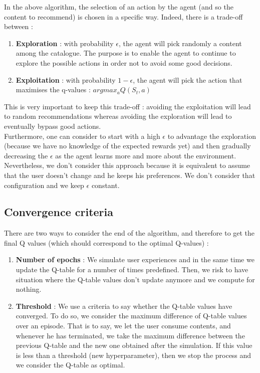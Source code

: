 \documentclass[a4paper]{article}
\begin{document}
In the above algorithm, the selection of an action by the agent (and so the content to recommend) is chosen in a specific way. Indeed, there is a trade-off between : 
	\begin{enumerate}
		\item \textbf{Exploration} : with probability $\epsilon$, the agent will pick randomly a content among the catalogue. The purpose is to enable the agent to continue to explore the possible actions in order not to avoid some good decisions.  
		\item \textbf{Exploitation} : with probability $1 - \epsilon$, the agent will pick the action that maximises the q-values : $argmax_{a}  Q(S_t, a)   $
	\end{enumerate}
This is very important to keep this trade-off : avoiding the exploitation will lead to random recommendations whereas avoiding the exploration will lead to eventually bypass good actions. \\
Furthermore, one can consider to start with a high $\epsilon$ to advantage the exploration (because we have no knowledge of the expected rewards yet) and then gradually decreasing the $\epsilon$ as the agent learns more and more about the environment.\\
 Nevertheless, we don't consider this approach because it is equivalent to assume that the user doesn't change and he keeps his preferences. We don't consider that configuration and we keep $\epsilon$ constant.  
    
    
\subsection{Convergence criteria}
There are two ways to consider the end of the algorithm, and therefore to get the final Q values (which should correspond to the optimal Q-values) : 
	\begin{enumerate}
		\item \textbf{Number of epochs} : We simulate user experiences and in the same time we update the Q-table for a number of times predefined. Then, we risk to have situation where the Q-table values don't update anymore and we compute for nothing.
		\item \textbf{Threshold} : We use a criteria to say whether the Q-table values have converged. To do so, we consider the maximum difference of Q-table values over an episode. That is to say, we let the user consume contents, and whenever he has terminated, we take the maximum difference between the previous Q-table and the new one obtained after the simulation. If this value is less than a threshold (new hyperparameter), then we stop the process and we consider the Q-table as optimal.
	\end{enumerate}
    
\end{document}
